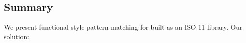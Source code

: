 

\subsection{Summary}

We present functional-style pattern matching for \Cpp{} built as an ISO 
\Cpp{}11 library. Our solution:

